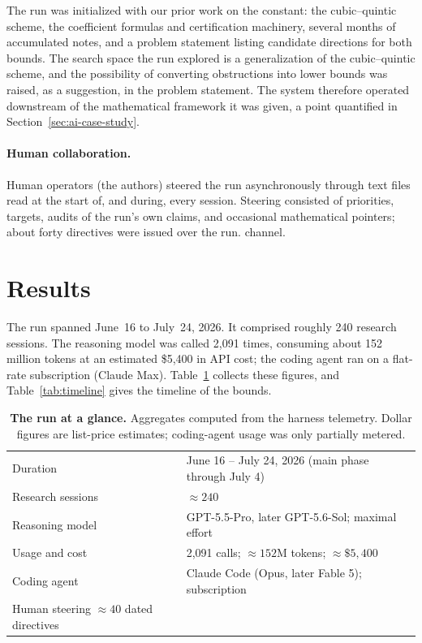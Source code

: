 The run was initialized with our prior work on the constant: the
cubic--quintic scheme, the coefficient formulas and certification
machinery, several months of accumulated notes, and a problem statement
listing candidate directions for both bounds. The search space the run
explored is a generalization of the cubic--quintic scheme, and the
possibility of converting obstructions into lower bounds was raised, as a
suggestion, in the problem statement. The system therefore operated
downstream of the mathematical framework it was given, a point quantified
in Section~\ref{sec:ai-case-study}.

\paragraph{Human collaboration.}
Human operators (the authors) steered the run asynchronously
through text files read at the start of, and during, every session.
Steering consisted of priorities, targets, audits of the run's own claims,
and occasional mathematical pointers; about forty directives were
issued over the run. 
channel.

\section{Results}
\label{sec:ai-results}

The run spanned June~16 to July~24, 2026. It comprised
roughly 240 research sessions. The reasoning model was called 2{,}091
times, consuming about 152 million tokens at an estimated \$5{,}400 in
API cost; the coding agent ran on a flat-rate subscription (Claude Max).
Table~\ref{tab:run} collects these figures, and
Table~\ref{tab:timeline} gives the timeline of the bounds.

\begin{table}[t]
\centering
\small
\begin{tabular}{@{}ll@{}}
\toprule
Duration & June 16 -- July 24, 2026 (main phase through July 4)\\
Research sessions & $\approx240$\\
Reasoning model & GPT-5.5-Pro, later GPT-5.6-Sol; maximal effort\\
Usage and cost & 2{,}091 calls; $\approx152$M tokens; $\approx\$5{,}400$\\
Coding agent & Claude Code (Opus, later Fable 5); subscription\\
Human steering  $\approx40$ dated directives\\
\bottomrule
\end{tabular}
\caption{\textbf{The run at a glance.} Aggregates computed from the harness
telemetry. Dollar figures are list-price estimates; coding-agent usage was
only partially metered.
}
\label{tab:run}
\end{table}

